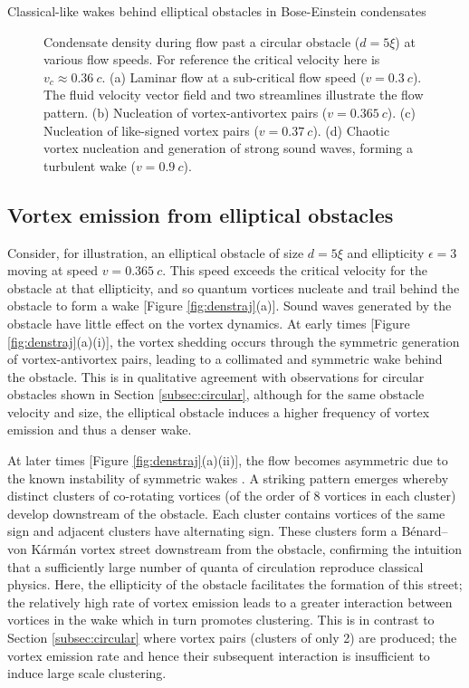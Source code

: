 \begin{chapter}{\label{cha:wake}Classical-like wakes behind elliptical obstacles in Bose-Einstein condensates}
\begin{figure}
  \caption{\label{fig:denstypes} Condensate density during flow past a circular obstacle ($d = 5\xi$) at various flow speeds. For reference the critical velocity here is $v_c \approx 0.36~c$.  (a) Laminar flow at a sub-critical flow speed ($v=0.3~c$).  The fluid velocity vector field and two streamlines illustrate the flow pattern. (b) Nucleation of vortex-antivortex pairs ($v=0.365~c$).  (c) Nucleation of like-signed vortex pairs ($v=0.37~c$). (d)  Chaotic vortex nucleation and generation of strong sound waves, forming a turbulent wake ($v=0.9~c$).}
\end{figure}

\subsection{Vortex emission from elliptical obstacles}
Consider, for illustration, an elliptical obstacle of size $d=5\xi$ and ellipticity $\epsilon=3$ moving at speed $v=0.365~c$.  This speed exceeds the critical velocity for the obstacle at that ellipticity, and so quantum vortices nucleate and trail behind the obstacle to form a wake [Figure \ref{fig:denstraj}(a)].  Sound waves generated by the obstacle have little effect on the vortex dynamics. At early times [Figure \ref{fig:denstraj}(a)(i)], the vortex shedding occurs through the symmetric generation of vortex-antivortex pairs, leading to a collimated and symmetric wake behind the obstacle.  This is in qualitative agreement with observations for circular obstacles \cite{frisch92,nore93,win00,huepe00} shown in Section \ref{subsec:circular}, although for the same obstacle velocity and size, the elliptical obstacle induces a higher frequency of vortex emission and thus a denser wake. 

At later times [Figure \ref{fig:denstraj}(a)(ii)], the flow becomes asymmetric due to the known instability of symmetric wakes \cite{nore93}.  A striking pattern emerges whereby distinct clusters of co-rotating vortices (of the order of 8 vortices in each cluster) develop downstream of the obstacle.  Each cluster contains vortices of the same sign and adjacent clusters have alternating sign.  These clusters form a B\'enard--von K\'arm\'an vortex street downstream from the obstacle, confirming the intuition that a sufficiently large number of quanta of circulation reproduce classical physics.  Here, the ellipticity of the obstacle facilitates the formation of this street; the relatively high rate of vortex emission leads to a greater interaction between vortices in the wake which in turn promotes clustering.  This is in contrast to Section \ref{subsec:circular} where vortex pairs (clusters of only 2) are produced; the vortex emission rate and hence their subsequent interaction is insufficient to induce large scale clustering.


\end{chapter}
